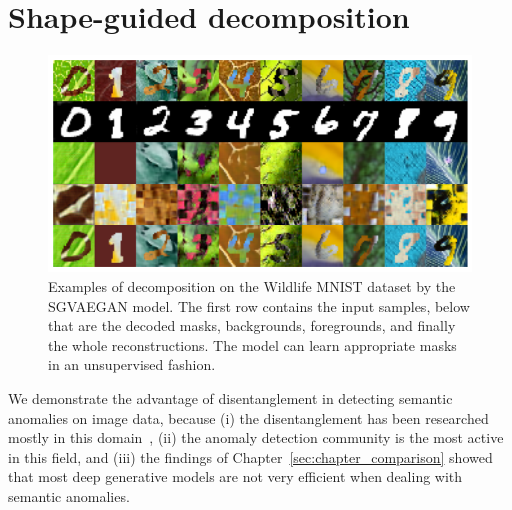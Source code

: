 \section{Shape-guided decomposition} \label{sec:model}
\begin{figure}[ht!]
    \centering
    \includegraphics[width=\textwidth]{data/chapter_sgvaegan/fig1_wmnist_grid.png}
    \caption{Examples of decomposition on the Wildlife MNIST dataset by the SGVAEGAN model. The first row contains the input samples, below that are the decoded masks, backgrounds, foregrounds, and finally the whole reconstructions. The model can learn appropriate masks in an unsupervised fashion.}
    \label{fig:wmnist_grid}
\end{figure}

We demonstrate the advantage of disentanglement in detecting semantic anomalies on image data, because (i) the disentanglement has been researched mostly in this domain~\cite{kim2018disentangling, kim2019bayes, choi2020discond}, (ii) the anomaly detection community is the most active in this field, and (iii) the findings of Chapter~\ref{sec:chapter_comparison} showed that most deep generative models are not very efficient when dealing with semantic anomalies.

